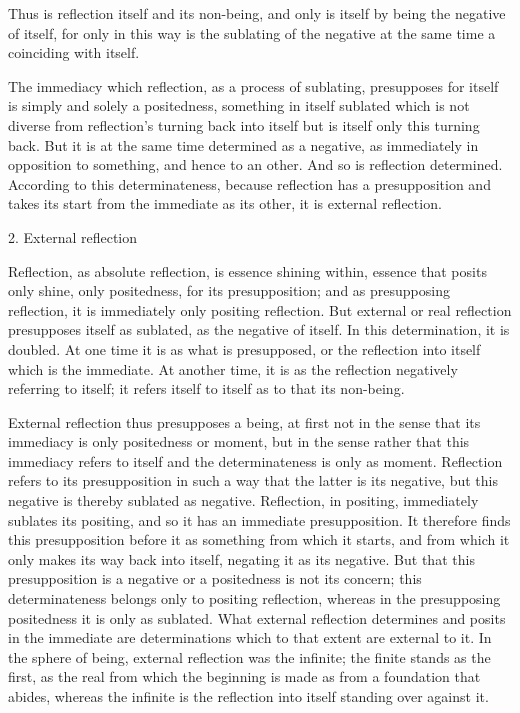 Thus is reflection itself and its non-being,
and only is itself by being the negative of itself,
for only in this way is the sublating of the negative
at the same time a coinciding with itself.

The immediacy which reflection, as a process of sublating,
presupposes for itself is simply and solely a positedness,
something in itself sublated which is not diverse from
reflection's turning back into itself
but is itself only this turning back.
But it is at the same time determined as a negative,
as immediately in opposition to something, and hence to an other.
And so is reflection determined.
According to this determinateness,
because reflection has a presupposition
and takes its start from the immediate as its other,
it is external reflection.

2. External reflection

Reflection, as absolute reflection, is essence shining within,
essence that posits only shine, only positedness, for its presupposition;
and as presupposing reflection, it is immediately only positing reflection.
But external or real reflection presupposes itself as sublated,
as the negative of itself.
In this determination, it is doubled.
At one time it is as what is presupposed,
or the reflection into itself which is the immediate.
At another time, it is as the reflection
negatively referring to itself;
it refers itself to itself as
to that its non-being.

External reflection thus presupposes a being,
at first not in the sense that
its immediacy is only positedness or moment,
but in the sense rather that
this immediacy refers to itself
and the determinateness is only as moment.
Reflection refers to its presupposition in such a way
that the latter is its negative,
but this negative is thereby sublated as negative.
Reflection, in positing, immediately sublates its positing,
and so it has an immediate presupposition.
It therefore finds this presupposition before it
as something from which it starts,
and from which it only makes its way back into itself,
negating it as its negative.
But that this presupposition is a negative
or a positedness is not its concern;
this determinateness belongs only to positing reflection,
whereas in the presupposing positedness
it is only as sublated.
What external reflection determines and posits in the immediate
are determinations which to that extent are external to it.
In the sphere of being, external reflection was the infinite;
the finite stands as the first,
as the real from which the beginning is made
as from a foundation that abides,
whereas the infinite is the reflection into itself
standing over against it.

